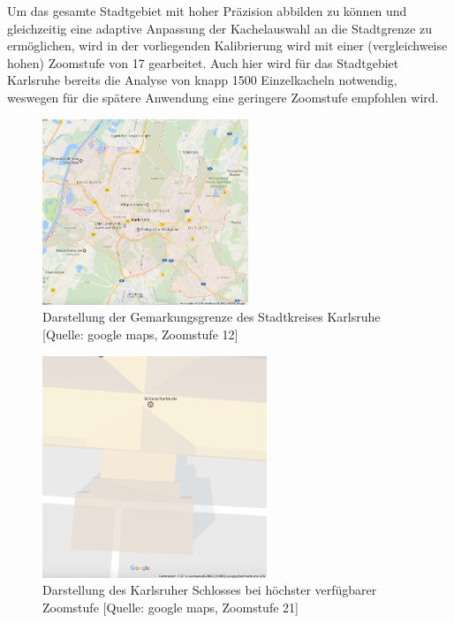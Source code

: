Um das gesamte Stadtgebiet mit hoher Präzision abbilden zu können und gleichzeitig eine adaptive Anpassung der Kachelauswahl an die Stadtgrenze zu ermöglichen, wird in der vorliegenden Kalibrierung wird mit einer (vergleichweise hohen) Zoomstufe von 17 gearbeitet. Auch hier wird für das Stadtgebiet Karlsruhe bereits die Analyse von knapp 1500 Einzelkacheln notwendig, weswegen für die spätere Anwendung eine geringere Zoomstufe empfohlen wird.\\
\newline
%
\begin{figure}
  \centering
    \includegraphics[width=0.55\textwidth]{images/3_Stadtgebiet_KA_zoom12.png}
    \caption{Darstellung der Gemarkungsgrenze des Stadtkreises Karlsruhe [Quelle: google maps, Zoomstufe 12]}
    \label{fig:Stadtgebiet_KA}
\end{figure}
%
\begin{figure}
  \centering
    \includegraphics[width=0.6\textwidth]{images/3_KA_Schloss_zoom21.png}
    \caption{Darstellung des Karlsruher Schlosses bei höchster verfügbarer Zoomstufe [Quelle: google maps, Zoomstufe 21]}
    \label{fig:Schloss_KA}
\end{figure}
